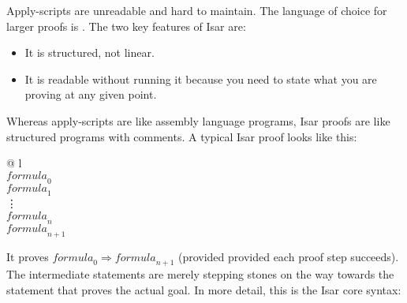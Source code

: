 %
\begin{isabellebody}%
\def\isabellecontext{Isar}%
%
\isadelimtheory
%
\endisadelimtheory
%
\isatagtheory
%
\endisatagtheory
{\isafoldtheory}%
%
\isadelimtheory
%
\endisadelimtheory
%
\isadelimML
%
\endisadelimML
%
\isatagML
%
\endisatagML
{\isafoldML}%
%
\isadelimML
%
\endisadelimML
%
\begin{isamarkuptext}%
Apply-scripts are unreadable and hard to maintain. The language of choice
for larger proofs is . The two key features of Isar are:
\begin{itemize}
\item It is structured, not linear.
\item It is readable without running it because
you need to state what you are proving at any given point.
\end{itemize}
Whereas apply-scripts are like assembly language programs, Isar proofs
are like structured programs with comments. A typical Isar proof looks like this:%
\end{isamarkuptext}%
\isamarkuptrue%
%
\begin{isamarkuptext}%
\begin{tabular}{@ {}l}
\\
\quad{} $\mathit{formula}_0$\\
\quad{} $\mathit{formula}_1$ \quad{} \\
\quad\vdots\\
\quad{} $\mathit{formula}_n$ \quad{} \\
\quad{} $\mathit{formula}_{n+1}$ \quad{} \\
\end{tabular}%
\end{isamarkuptext}%
\isamarkuptrue%
%
\begin{isamarkuptext}%
It proves $\mathit{formula}_0 \Longrightarrow \mathit{formula}_{n+1}$
(provided provided each proof step succeeds).
The intermediate  statements are merely stepping stones
on the way towards the  statement that proves the actual
goal. In more detail, this is the Isar core syntax:
\medskip


\end{isamarkuptext}
\end{isabellebody}
